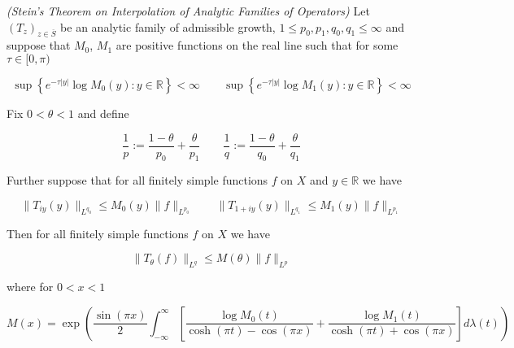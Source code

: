 \begin{mdframed}
	\begin{theorem}\emph{(Stein's Theorem on Interpolation of Analytic Families of Operators)}
		Let $\left( T_z \right)_{z \in \overline{S}}$ be an analytic family of admissible growth, $1 \leqslant p_0,p_1,q_0,q_1 \leqslant \infty$ and suppose that $M_0$, $M_1$ are positive functions on the real line such that for some $\tau \in [0,\pi)$

			\begin{equation}
				\sup\left\{e^{-\tau \vert y \vert} \log M_0(y) : y \in \mathbb{R}\right\} < \infty \qquad \sup\left\{e^{-\tau \vert y \vert} \log M_1(y) : y \in \mathbb{R}\right\} < \infty
			\end{equation}

			Fix $0 < \theta < 1$ and define

			\begin{equation}
				\frac{1}{p} := \frac{1 - \theta}{p_0} + \frac{\theta}{p_1} \qquad \frac{1}{q} := \frac{1 - \theta}{q_0} + \frac{\theta}{q_1}
			\end{equation}

			Further suppose that for all finitely simple functions $f$ on $X$ and $y \in \mathbb{R}$ we have

			\begin{equation}
				\|T_{iy}(y)\|_{L^{q_0}} \leqslant M_0(y)\|f\|_{L^{p_0}} \qquad \|T_{1 + iy}(y)\|_{L^{q_1}} \leqslant M_1(y)\|f\|_{L^{p_1}} 
			\end{equation}

			Then for all finitely simple functions $f$ on $X$ we have

			\begin{equation*}
				\|T_\theta(f)\|_{L^q} \leqslant M(\theta)\|f\|_{L^p}
			\end{equation*}

			where for $0 < x < 1$

			\begin{equation*}
				M(x) = \exp\left( \frac{\sin(\pi x)}{2} \int_{-\infty}^\infty \left[ \frac{\log M_0(t)}{\cosh(\pi t) - \cos(\pi x)} + \frac{\log M_1(t)}{\cosh(\pi t) + \cos(\pi x)}\right] d\lambda(t) \right)
			\end{equation*}
	\end{theorem}
\end{mdframed}


